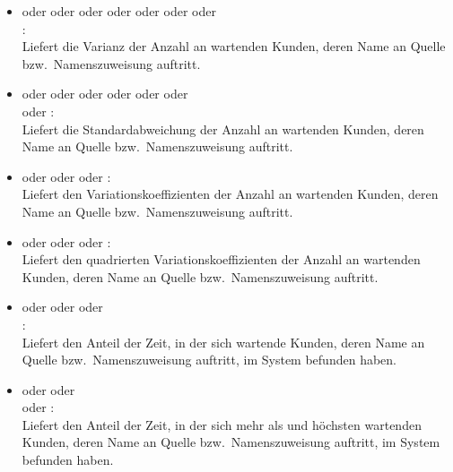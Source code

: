 \begin{itemize}
\item
{} oder  oder  oder  oder  oder  oder  oder\\
:\\
Liefert die Varianz der Anzahl an wartenden Kunden, deren Name an Quelle bzw.\ Namenszuweisung  auftritt.

\item
{} oder  oder  oder  oder  oder  oder\\  oder :\\
Liefert die Standardabweichung der Anzahl an wartenden Kunden, deren Name an Quelle bzw.\ Namenszuweisung  auftritt.

\item
{} oder  oder  oder :\\
Liefert den Variationskoeffizienten der Anzahl an wartenden Kunden, deren Name an Quelle bzw.\ Namenszuweisung  auftritt.

\item
{} oder  oder  oder :\\
Liefert den quadrierten Variationskoeffizienten der Anzahl an wartenden Kunden, deren Name an Quelle bzw.\ Namenszuweisung  auftritt.

\item
{} oder  oder  oder\\ :\\
Liefert den Anteil der Zeit, in der sich  wartende Kunden, deren Name an Quelle bzw.\ Namenszuweisung  auftritt, im System befunden haben.

\item
{} oder  oder\\  oder :\\
Liefert den Anteil der Zeit, in der sich mehr als  und höchsten  wartenden Kunden, deren Name an Quelle bzw.\ Namenszuweisung  auftritt, im System befunden haben.

\end{itemize}






